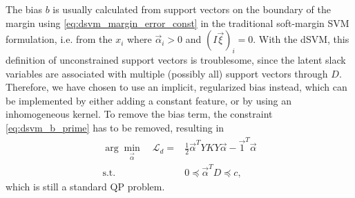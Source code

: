 The bias $b$ is usually calculated from support vectors on the
boundary of the margin using \eqref{eq:dsvm_margin_error_const} in the
traditional soft-margin \ac{SVM} formulation, i.e. from the $x_i$ where
$\vec{\alpha}_i > 0$ and $(I\vec{\xi})_i = 0$. 
%
%
With the \ac{dSVM}, this definition of unconstrained support vectors is
troublesome, since the latent slack variables are associated with multiple
(possibly all) support vectors through $D$. Therefore, we have chosen to use an
implicit, regularized bias instead, which can be implemented by either adding a
constant feature, or by using an inhomogeneous kernel. To remove the bias term,
the constraint \eqref{eq:dsvm_b_prime} has to be removed, resulting in
%
\begin{align}
  \arg\min_{\vec{\alpha}} \quad \mathcal{L}_d = & 
  \frac{1}{2} \vec{\alpha}^T Y K Y \vec{\alpha}
  - \vec{1}^T\vec{\alpha}
\\
  \text{s.t.} \quad &
  0 \preceq \vec{\alpha}^T D \preceq c,
\end{align}
which is still a standard \ac{QP} problem.

